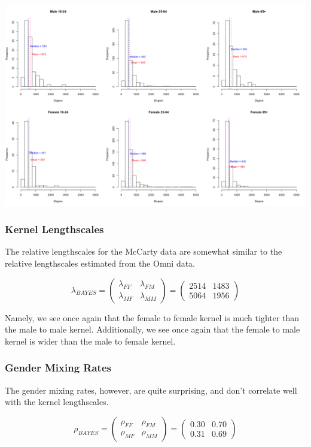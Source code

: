 \documentclass[12pt]{article}
\begin{document}
\begin{center}
\includegraphics[scale = 0.33]{Estimates_Degree_McCarty_NoRecall.png}
\end{center}

\subsubsection*{Kernel Lengthscales}
\noindent The relative lengthscales for the McCarty data are somewhat similar to the relative lengthscales estimated from the Omni data.

$$ \lambda_{BAYES}
= \left( \begin{array}{cc} \lambda_{FF} & \lambda_{FM} \\
\lambda_{MF} & \lambda_{MM} \end{array} \right) 
= \left( \begin{array}{cc}
2514 & 1483 \\
5064 & 1956 \end{array} \right) $$ \vspace{7 pt}

\noindent Namely, we see once again that the female to female kernel is much tighter than the male to male kernel. Additionally, we see once again that the female to male kernel is wider than the male to female kernel.

\subsubsection*{Gender Mixing Rates}
\noindent The gender mixing rates, however, are quite surprising, and don't correlate well with the kernel lengthscales.

$$ \rho_{BAYES}
= \left( \begin{array}{cc} \rho_{FF} & \rho_{FM} \\
\rho_{MF} & \rho_{MM} \end{array} \right) 
= \left( \begin{array}{cc}
0.30 & 0.70 \\
0.31 & 0.69 \end{array} \right) $$
\end{document}
